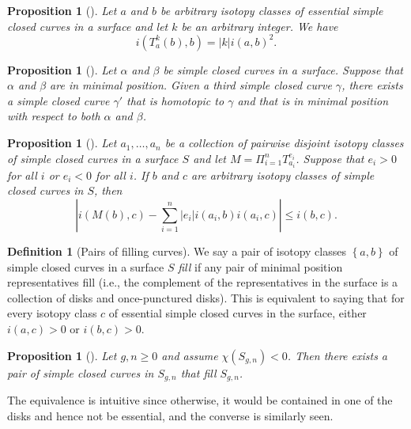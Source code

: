 \documentclass[reqno]{amsart}
\newtheorem{proposition}[theorem]{Proposition}
\theoremstyle{definition}
\newtheorem{definition}[theorem]{Definition}
\theoremstyle{remark}
\begin{document}
\begin{proposition}[]
    Let $a$ and $b$ be arbitrary isotopy classes of essential
    simple closed curves in a surface and let $k$ be
    an arbitrary integer. We have
    \[
    i \left( T_{a}^{k}(b), b \right) =
    \left| k \right| i\left( a,b \right)^2.
    \] 
\end{proposition}

\begin{proposition}[]
    Let $\alpha$ and $\beta$ be simple closed curves in a surface.
    Suppose that $\alpha$ and $\beta$ are in minimal position.
    Given a third simple closed curve $\gamma$, there
    exists a simple closed curve $\gamma'$ that is
    homotopic to $\gamma$ and that is in minimal position
    with respect to both $\alpha$ and $\beta$.
\end{proposition}


\begin{proposition}[]
    Let $a_1 ,\ldots, a_n$ be a collection of pairwise
    disjoint isotopy classes of simple closed curves in
    a surface $S$ and let $M = \Pi_{i=1}^{n}T_{a_i}^{e_i}$.
    Suppose that $e_i > 0$ for all $i$ or $e_i < 0$ for
    all $i$. If $b$ and $c$ are arbitrary isotopy
    classes of simple closed curves in $S$, then
    \[
    \left| i \left( M(b), c \right) -
    \sum_{i=1}^{n} \left| e_i \right| i(a_i,b)
    i(a_i,c) \right| \le i(b,c).
    \] 
\end{proposition}

\begin{definition}[Pairs of filling curves]
    We say a pair of isotopy classes $\left\{ a,b \right\} $ of
    simple closed curves in a surface $S$ \textit{fill} if
    any pair of minimal position representatives
    fill (i.e., the complement of the representatives
    in the surface is a collection of disks and
    once-punctured disks).
    This is equivalent to saying that for every
    isotopy class $c$ of essential simple closed curves
    in the surface, either
    $i \left( a,c \right) >0$ or $i(b,c) > 0$.
\end{definition}

\begin{proposition}[]
    Let $g, n \ge 0$ and assume $\chi \left( S_{g,n} \right) <0$.
    Then there exists a pair of simple closed curves in
    $S_{g,n}$ that fill $S_{g,n}$.
\end{proposition}

The equivalence is intuitive since otherwise, it would be
contained in one of the disks and hence not be essential, and
the converse is similarly seen.
\end{document}
